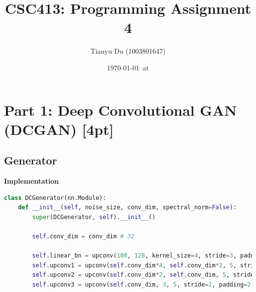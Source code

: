 \documentclass{article}
\title{CSC413: Programming Assignment 4}
\date{\today\ at \currenttime}
\author{Tianyu Du (1003801647)}
\begin{document}
	\maketitle
	\section{Part 1: Deep Convolutional GAN (DCGAN) [4pt]}
	\subsection{Generator}
	\textbf{Implementation} %
	\begin{lstlisting}[language=python]
class DCGenerator(nn.Module):
    def __init__(self, noise_size, conv_dim, spectral_norm=False):
        super(DCGenerator, self).__init__()

        self.conv_dim = conv_dim # 32

        self.linear_bn = upconv(100, 128, kernel_size=4, stride=3, padding=2, batch_norm=True)
        self.upconv1 = upconv(self.conv_dim*4, self.conv_dim*2, 5, stride=2, padding=2, batch_norm=True, spectral_norm=spectral_norm)
        self.upconv2 = upconv(self.conv_dim*2, self.conv_dim, 5, stride=2, padding=2, batch_norm=True, spectral_norm=spectral_norm)
        self.upconv3 = upconv(self.conv_dim, 3, 5, stride=2, padding=2, batch_norm=False, spectral_norm=spectral_norm)
	\end{lstlisting}
\end{document}
